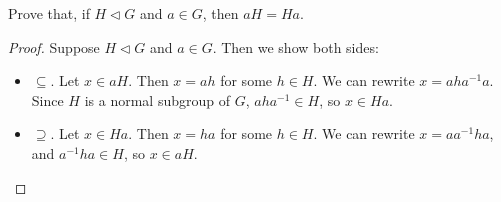 \begin{example}
Prove that, if $H \triangleleft G$ and $a \in G$, then $aH = Ha$.
\end{example}

\begin{proof}
Suppose $H \triangleleft G$ and $a \in G$. Then we show both sides:
\begin{itemize}
    \item $\subseteq$. Let $x \in aH$. Then $x = ah$ for some $h \in H$. We can rewrite $x = aha^{-1}a$. Since $H$ is a normal subgroup of $G$, $aha^{-1} \in H$, so $x \in Ha$.
    \item $\supseteq$. Let $x \in Ha$. Then $x = ha$ for some $h \in H$. We can rewrite $x = aa^{-1}ha$, and $a^{-1}ha \in H$, so $x \in aH$.
\end{itemize}
\end{proof}